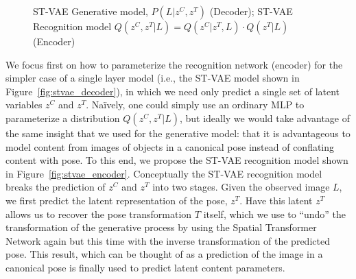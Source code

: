 \begin{figure}[t]
\begin{center}
\qquad\qquad
{}\vspace{-4mm}
\end{center}
 \caption{\footnotesize
  ST-VAE Generative model, $P(L | z^C, z^T)$ (Decoder);  ST-VAE Recognition model $Q(z^C,z^T | L) = Q(z^C | z^T, L)\cdot Q(z^T | L)$ (Encoder)   
  }\vspace{-5mm}
\label{fig:stvaemodel}
\end{figure}


We focus first on how to parameterize the recognition network (encoder) for the simpler case of a single layer model (i.e., the ST-VAE model
shown in Figure~\ref{fig:stvae_decoder}), in which we need only predict a single set of latent variables $z^C$ and $z^T$.
Na\"{i}vely, one could 
simply use an ordinary MLP to parameterize a distribution $Q(z^C, z^T | L)$, but ideally we would take advantage of the same
 insight that we used for the generative model: that it is advantageous to model content from images of objects in a canonical pose instead
 of conflating content with pose.  To this end, we propose the ST-VAE recognition model shown in Figure~\ref{fig:stvae_encoder}. 
Conceptually the ST-VAE recognition model breaks the prediction of $z^C$ and $z^T$ into two stages.  Given the observed image $L$,
we first predict the latent representation of the pose, $z^T$.  Have this latent $z^T$ allows us to recover the pose transformation 
$T$ itself, which we use to ``undo'' the transformation of the generative process
by using the Spatial Transformer Network again but this time with the inverse transformation of the predicted pose.  This result, which can be
thought of as a prediction of the image in a canonical pose is finally used to predict latent content parameters.


